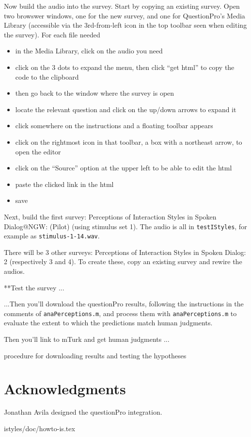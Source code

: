 \documentclass[11pt]{article}
\begin{document}
Now build the audio into the survey.  Start by copying an existing
survey. Open two browswer windows, one for the new survey, and one for
QuestionPro's Media Library (accessible via the 3rd-from-left icon in
the top toolbar seen when editing the survey).  For each file needed
\begin{itemize}   \setlength{\itemsep}{0pt}\setlength{\parskip}{0pt}
\item in the Media Library, click on the audio you need
\item click on the 3 dots to expand the menu, then click ``get html'' to copy the code to the clipboard
\item then go back to the window where the survey is open 
\item locate the relevant question and click on the up/down arrows to expand it
\item click somewhere on the instructions and a floating toolbar appears
\item click on the rightmost icon in that toolbar, a box with a northeast arrow, to open the editor
\item click on the ``Source'' option at the upper left to be able to edit the html
\item paste the clicked link in the html
\item save 
\end{itemize}

Next, build the first survey: Perceptions of Interaction Styles in
Spoken Dialog@NGW: (Pilot) (using stimulus set 1).  The audio is all in
{\tt testIStyles}, for example as {\tt stimulus-1-14.wav}.

There will be 3 other surveys: Perceptions of Interaction Styles in
Spoken Dialog: 2 (respectively 3 and 4).  To create these, copy an
existing survey and rewire the audios.

**Test the survey ... 


...Then you'll download the questionPro results, following the
instructions in the comments of {\tt anaPerceptions.m}, and process
them with {\tt anaPerceptions.m} to evaluate the extent to which the
predictions match human judgments.

Then you'll link to mTurk and get human judgments ...

procedure for downloading results and testing the hypotheses


\section{Acknowledgments }  

Jonathan Avila designed the questionPro integration. 


\hfill istyles/doc/howto-is.tex


%

\end{document}
